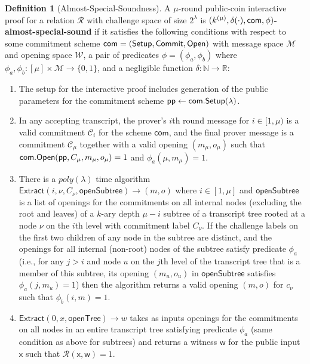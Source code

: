 \documentclass{article}
\theoremstyle{definition}
\newtheorem{definition}{Definition}
\begin{document}
\begin{definition}[Almost-Special-Soundness]\label{def:darkspecialsoundness} A $\mu$-round public-coin interactive proof for a relation $\mathcal{R}$ with challenge space of size $2^\lambda$ is \textbf{$(k^{(\mu)}, \delta(\cdot), \mathsf{com}, \phi)$-almost-special-sound} if it satisfies the following conditions with respect to some commitment scheme 
$\mathsf{com} = (\textsf{{Setup}},\textsf{{Commit}}, \textsf{{Open}})$ with message space $\mathcal{M}$ and opening space $\mathcal{W}$, a pair of predicates $\phi = (\phi_a, \phi_b)$ where $\phi_a, \phi_b:[\mu] \times \mathcal{M}  \rightarrow \{0,1\}$, and a negligible function $\delta: \mathbb{N} \rightarrow \mathbb{R}$:

\begin{enumerate} 
\item The setup for the interactive proof includes generation of the public parameters for the commitment scheme $\textsf{pp} \gets \textsf{com}.\textsf{{Setup}}(\lambda)$.  
\item  In any accepting transcript, the prover's $i$th round message for $i \in [1,\mu)$ is a valid commitment $\mathcal{C}_i$ for the scheme $\mathsf{com}$, and the final prover message is a commitment $\mathcal{C}_\mu$ together with a valid opening $(m_\mu, o_\mu)$ such that $\textsf{com}.\textsf{{Open}}(\textsf{pp},C_\mu, m_\mu, o_\mu) = 1$ and $\phi_a(\mu, m_\mu) = 1$. 


\item  There is a $poly(\lambda)$ time algorithm $\textsf{Extract}(i, \nu, C_\nu, \textsf{openSubtree}) \rightarrow (m, o)$ where $i \in [1,\mu]$ and $\textsf{openSubtree}$ is a list of openings for the commitments on all internal nodes (excluding the root and leaves) of a $k$-ary depth $\mu - i$ subtree of a transcript tree rooted at a node $\nu$ on the $i$th level with commitment label $C_\nu$. If the challenge labels on the first two children of any node in the subtree are distinct, and the openings for all internal (non-root) nodes of the subtree satisfy predicate $\phi_a$ (i.e., for any $j > i$ and node $u$ on the $j$th level of the transcript tree that is a member of this subtree, its opening $(m_u, o_u)$ in $\textsf{openSubtree}$ satisfies $\phi_a(j, m_u)= 1$) then the algorithm returns a valid opening $(m,o)$ for $c_\nu$ such that $\phi_b(i, m) = 1$.  

\item  $\textsf{Extract}(0,x,\textsf{openTree}) \rightarrow w$ takes as inputs openings for the commitments on all nodes in an entire transcript tree satisfying predicate $\phi_a$ (same condition as above for subtrees) and returns a witness $\mathsf{w}$ for the public input $\mathsf{x}$ such that $\mathcal{R}(\mathsf{x},\mathsf{w})=1$. 


\end{enumerate}
\end{definition}
\end{document}
